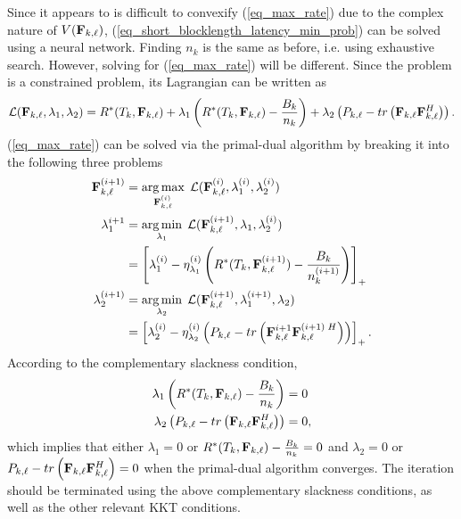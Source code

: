 \documentclass[a4paper, 12pt, onecolumn, journal, twoside, draftclsnofoot]{IEEEtran}
\begin{document}
Since it appears to is difficult to convexify (\ref{eq_max_rate}) due to the complex nature of $V({\bf F}_{k,\ell})$, (\ref{eq_short_blocklength_latency_min_prob}) can be solved using a neural network.  Finding $n_k$ is the same as before, i.e. using exhaustive search.  However, solving for (\ref{eq_max_rate}) will be different.  Since the problem is a constrained problem, its Lagrangian can be written as
\begin{equation*}
	{ \mathcal{L} } ({\bf F}_{k,\ell}, \lambda_1, \lambda_2) = R^*(T_k, {\bf F}_{k,\ell}) + \lambda_1 \left( R^*(T_k, {\bf F}_{k,\ell}) - \frac{B_k}{n_k} \right) + \lambda_2 \left( P_{k,\ell} - tr\left({\bf F}_{k,\ell} {\bf F}_{k,\ell}^H \right) \right).
\end{equation*}
(\ref{eq_max_rate}) can be solved via the primal-dual algorithm by breaking it into the following three problems
\begin{subequations}
	\begin{align}
		{\bf F}_{k,\ell}^{(i+1)} &= \operatorname*{arg\,max}_{{\bf F}_{k,\ell}^{(i)}} \; { \mathcal{L} } ({\bf F}_{k,\ell}^{(i)}, \lambda_1^{(i)}, \lambda_2^{(i)})	\label{eq_F_soln} \\
		\lambda_1^{i+1} &= \operatorname*{arg\,min}_{\lambda_1} \; { \mathcal{L} } ({\bf F}_{k,\ell}^{(i+1)}, \lambda_1, \lambda_2^{(i)})	\nonumber \\
		&= \left[ \lambda_1^{(i)}  - \eta_{\lambda_1}^{(i)} \left( R^*(T_k, {\bf F}_{k,\ell}^{(i+1)}) - \frac{B_k}{n_k^{(i+1)}} \right) \right]_+ 	\label{eq_lambda1_soln}	\\
		\lambda_2^{(i+1)} &= \operatorname*{arg\,min}_{\lambda_2} \; { \mathcal{L} } ({\bf F}_{k,\ell}^{(i+1)}, \lambda_1^{(i+1)}, \lambda_2) \nonumber \\
		&=  \left[  \lambda_2^{(i)} - \eta_{\lambda_2}^{(i)} \left( P_{k,\ell} - tr\left({\bf F}_{k,\ell}^{i+1} {\bf F}_{k,\ell}^{(i+1) \; H} \right) \right) \right]_+.
			\label{eq_lambda2_soln}
	\end{align}
	\label{eq_soln}
\end{subequations}
According to the complementary slackness condition, 
\begin{align*}
	\lambda_1 \left( R^*(T_k, {\bf F}_{k,\ell}) - \frac{B_k}{n_k} \right) &= 0 \\
	\lambda_2 \left( P_{k,\ell} - tr\left({\bf F}_{k,\ell} {\bf F}_{k,\ell}^H \right) \right) &= 0, 
\end{align*}
which implies that either $\lambda_1 = 0$ or $R^*(T_k, {\bf F}_{k,\ell}) - \frac{B_k}{n_k} = 0$ and $\lambda_2 = 0$ or $P_{k,\ell} - tr\left({\bf F}_{k,\ell} {\bf F}_{k,\ell}^H \right) = 0$ when the primal-dual algorithm converges.  The iteration should be terminated using the above complementary slackness conditions, as well as the other relevant KKT conditions.
\end{document}
